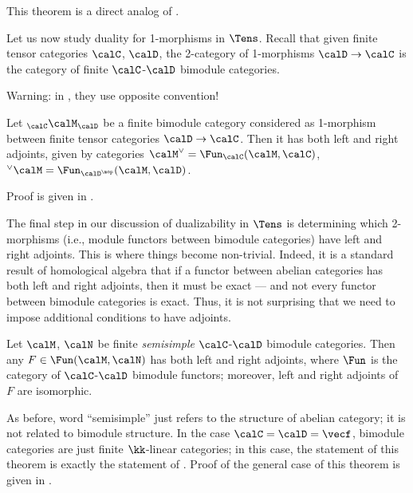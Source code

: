 This theorem is a direct analog of .

Let us now study duality for 1-morphisms in $\Tens$. Recall that given finite
tensor categories $\calC$, $\calD$, the 2-category of 1-morphisms
$\calD\to\calC$ is the category of finite $\calC$-$\calD$ bimodule categories.

Warning: in \cite{dsps-dualizable}, they use opposite convention!

\begin{theorem}\label{t:bimodule-dualizable}
  Let ${}_\calC\calM_\calD$ be a finite bimodule category considered as
  1-morphism between finite tensor categories $\calD\to\calC$. Then it has both
  left and right adjoints, given by categories $\calM^\vee=\Fun_\calC(\calM,
  \calC)$, ${}^\vee\calM=\Fun_{\calD^\mop}(\calM, \calD)$.
\end{theorem}

Proof is given in \cite[Proposition 3.2.1]{dsps-dualizable}.


The final step in our discussion of dualizability in $\Tens$ is determining
which 2-morphisms (i.e., module functors between bimodule categories) have left
and right adjoints. This is where things become non-trivial. Indeed, it is a
standard result of homological algebra that if a functor between abelian
categories has both left and right adjoints, then it must be exact --- and not
every functor between bimodule categories is exact. Thus, it is not surprising
that we need to impose additional conditions to have adjoints.

\begin{theorem}\label{t:tens-dual-2-morph}
  Let $\calM$, $\calN$ be finite \emph{semisimple} $\calC$-$\calD$ bimodule
  categories. Then any $F\in \Fun (\calM, \calN)$ has both left and right
  adjoints, where $\Fun$ is the category of $\calC$-$\calD$ bimodule functors;
  moreover, left and right adjoints of $F$ are isomorphic.
\end{theorem}
As before, word ``semisimple'' just refers to the structure of abelian category;
it is not related to bimodule structure.
In the case $\calC=\calD=\vecf$, bimodule categories are just finite
$\kk$-linear categories; in this case, the statement of this theorem is exactly
the statement of . Proof of the general case of this
theorem is given in  \cite[Proposition 3.4.1]{dsps-dualizable}.

